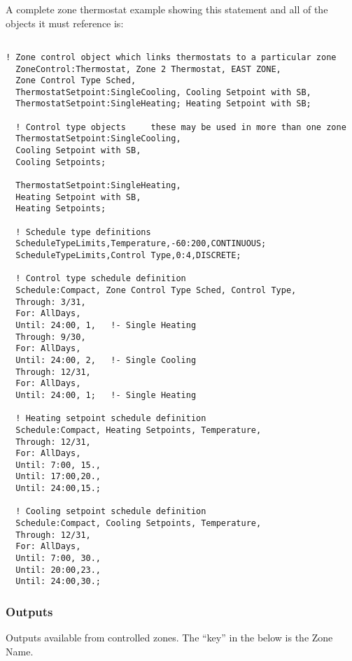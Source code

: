 A complete zone thermostat example showing this statement and all of the objects it must reference is:

\begin{lstlisting}

! Zone control object which links thermostats to a particular zone
  ZoneControl:Thermostat, Zone 2 Thermostat, EAST ZONE,
  Zone Control Type Sched,
  ThermostatSetpoint:SingleCooling, Cooling Setpoint with SB,
  ThermostatSetpoint:SingleHeating; Heating Setpoint with SB;

  ! Control type objects     these may be used in more than one zone
  ThermostatSetpoint:SingleCooling,
  Cooling Setpoint with SB,
  Cooling Setpoints;

  ThermostatSetpoint:SingleHeating,
  Heating Setpoint with SB,
  Heating Setpoints;

  ! Schedule type definitions
  ScheduleTypeLimits,Temperature,-60:200,CONTINUOUS;
  ScheduleTypeLimits,Control Type,0:4,DISCRETE;

  ! Control type schedule definition
  Schedule:Compact, Zone Control Type Sched, Control Type,
  Through: 3/31,
  For: AllDays,
  Until: 24:00, 1,   !- Single Heating
  Through: 9/30,
  For: AllDays,
  Until: 24:00, 2,   !- Single Cooling
  Through: 12/31,
  For: AllDays,
  Until: 24:00, 1;   !- Single Heating

  ! Heating setpoint schedule definition
  Schedule:Compact, Heating Setpoints, Temperature,
  Through: 12/31,
  For: AllDays,
  Until: 7:00, 15.,
  Until: 17:00,20.,
  Until: 24:00,15.;

  ! Cooling setpoint schedule definition
  Schedule:Compact, Cooling Setpoints, Temperature,
  Through: 12/31,
  For: AllDays,
  Until: 7:00, 30.,
  Until: 20:00,23.,
  Until: 24:00,30.;
\end{lstlisting}

\subsubsection{Outputs}\label{outputs-042}

Outputs available from controlled zones. The ``key'' in the below is the Zone Name.

